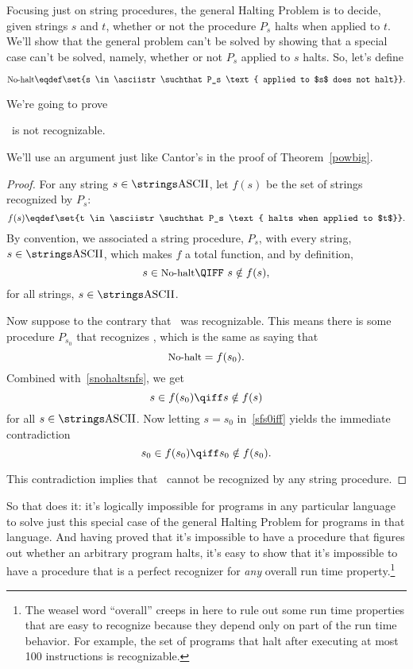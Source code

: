 Focusing just on string procedures, the general Halting Problem
is to decide, given strings $s$ and $t$, whether or not the procedure
$P_s$ halts when applied to $t$.  We'll show that the general problem
can't be solved by showing that a special case can't be solved,
namely, whether or not $P_s$ applied to $s$ halts.  So, let's define
\begin{definition}\label{nohalt_def}
\begin{equation}\label{nohalt_eqdef}
\nohalt \eqdef \set{s \in \asciistr \suchthat P_s \text{ applied to
    $s$ does not halt}}.
\end{equation}
\end{definition}
We're going to prove
\begin{theorem}\label{nohalt_thm}
\nohalt\ is not recognizable.
\end{theorem}

We'll use an argument just like Cantor's in the proof of
Theorem~\ref{powbig}.

\begin{proof}
For any string $s \in \asciistr$, let
$f(s)$ be the set of strings recognized by $P_s$:
\[
f(s) \eqdef \set{t \in \asciistr \suchthat P_s \text{ halts when applied to
    $t$}}.
\]
By convention, we associated a string procedure, $P_s$, with every
string, $s \in \asciistr$, which makes $f$ a total function, and by
definition,
\begin{equation}\label{snohaltsnfs}
s \in \nohalt \QIFF\ s \notin f(s),
\end{equation}
for all strings, $s \in \asciistr$.

Now suppose to the contrary that \nohalt\ was recognizable.  This
means there is some procedure $P_{s_0}$ that recognizes \nohalt, which
is the same as saying that
\[
\text{\small{No-halt}} = f(s_0).
\]
Combined with~\eqref{snohaltsnfs}, we get
\begin{equation}\label{sfs0iff}
s \in f(s_0) \qiff s \notin f(s)
\end{equation}
for all $s \in \asciistr$.  Now letting $s = s_0$ in~\eqref{sfs0iff}
yields the immediate contradiction
\[
s_0 \in f(s_0) \qiff s_0 \notin f(s_0).
\]

This contradiction implies that \nohalt\ cannot be recognized by any
string procedure.
\end{proof}

So that does it: it's logically impossible for programs in any
particular language to solve just this special case of the general
Halting Problem for programs in that language.  And having proved that
it's impossible to have a procedure that figures out whether an
arbitrary program halts, it's easy to show that it's impossible to
have a procedure that is a perfect recognizer for \emph{any} overall
run time property.\footnote{The weasel word ``overall'' creeps in here
  to rule out some run time properties that are easy to recognize
  because they depend only on part of the run time behavior.  For
  example, the set of programs that halt after executing at most 100
  instructions is recognizable.}

